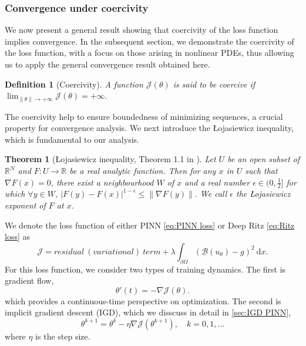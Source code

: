 \documentclass{article}
\newtheorem{theorem}{Theorem}
\newtheorem{definition}{Definition}
\renewcommand{\d}{\mathrm{d}}
\begin{document}
\subsubsection{Convergence under coercivity}\label{sec:convergence under coer}
We now present a general result showing that coercivity of the loss function implies convergence.
In the subsequent section, we demonstrate the coercivity of the loss function, with a focus on those arising in nonlinear PDEs, thus allowing us to apply the general convergence result obtained here.
\begin{definition}[Coercivity]\label{def:coercive}
    A function \( \mathcal{J}(\theta) \) is said to be coercive if  
$
    \lim_{\|\theta\| \to + \infty} \mathcal{J}(\theta) = +\infty.
$ 
\end{definition}
The coercivity help to ensure boundedness of minimizing sequences, a crucial property for convergence analysis. 
We next introduce the \L{}ojasiewicz inequality, which is fundamental to our analysis.
\begin{theorem}[\L{}ojasiewicz inequality, Theorem 1.1 in \cite{haraux2012some}]\label{thm:Lj}
Let $U$ be an open subset of $\mathbb{R}^N$ and $F: U \to \mathbb{R}$ be a real analytic function.
Then for any $x$ in $U$ such that $\nabla F(x)=0$, there exist a neighbourhood $W$ of $x$ and a real number  $\epsilon \in (0,\frac{1}{2}]$ for which
$
    \forall y \in W, \ |F(y)-F(x)|^{1-\epsilon} \leq  \|\nabla F(y)\|. 
$
We call $\epsilon$ the \L{}ojasiewicz exponent of $F$ at $x$.
\end{theorem}
We denote the loss function of either PINN \cref{eq:PINN loss} or Deep Ritz \cref{eq:Ritz loss} as 
\begin{equation}
\mathcal{J}=residual\ (variational)\ term + \lambda \int_{\partial \Omega}(\mathcal{B}(u_{\theta})-g)^2\ \d x. \label{eq:loss}
\end{equation}
For this loss function, we consider two types of training dynamics. The first is gradient flow,
\begin{equation}
    \theta'(t)=-\nabla \mathcal{J}(\theta) .\label{eq:gf}
\end{equation}
which provides a continuous-time perspective on optimization. 
The second is implicit gradient descent (IGD), which we disscuss in detail in \cref{sec:IGD PINN},
\begin{equation}
    \theta^{k+1} = \theta^k - \eta \nabla \mathcal{J}(\theta^{k+1}), \quad k=0,1,\ldots \label{eq:IGD}
\end{equation}
where \(\eta\) is the step size.
\end{document}
